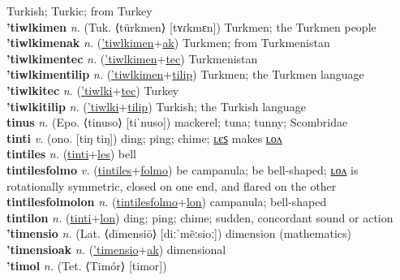 Turkish; Turkic; from Turkey \label{'tiwlkiak} \\
\textbf{'tiwlkimen} \textit{n.} (Tuk. ⟨türkmen⟩ [tʏɾkmɛn])
Turkmen; the Turkmen people \label{'tiwlkimen} \\
\textbf{'tiwlkimenak} \textit{n.} (\hyperref['tiwlkimen]{'tiwlkimen}+\hyperref[ak]{ak})
Turkmen; from Turkmenistan \label{'tiwlkimenak} \\
\textbf{'tiwlkimentec} \textit{n.} (\hyperref['tiwlkimen]{'tiwlkimen}+\hyperref[tec]{tec})
Turkmenistan \label{'tiwlkimentec} \\
\textbf{'tiwlkimentilip} \textit{n.} (\hyperref['tiwlkimen]{'tiwlkimen}+\hyperref[tilip]{tilip})
Turkmen; the Turkmen language \label{'tiwlkimentilip} \\
\textbf{'tiwlkitec} \textit{n.} (\hyperref['tiwlki]{'tiwlki}+\hyperref[tec]{tec})
Turkey \label{'tiwlkitec} \\
\textbf{'tiwlkitilip} \textit{n.} (\hyperref['tiwlki]{'tiwlki}+\hyperref[tilip]{tilip})
Turkish; the Turkish language \label{'tiwlkitilip} \\
\textbf{tinus} \textit{n.} (Epo. ⟨tinuso⟩ [tiˈnuso])
mackerel; tuna; tunny; Scombridae \label{tinus} \\
\textbf{tinti} \textit{v.} (ono. [tiŋ tiŋ])
ding; ping; chime; \hyperref[tintiles]{ʟєꜱ} makes \hyperref[tintilon]{ʟᴏᴧ} \label{tinti} \\
\textbf{tintiles} \textit{n.} (\hyperref[tinti]{tinti}+\hyperref[les]{les})
bell \label{tintiles} \\
\textbf{tintilesfolmo} \textit{v.} (\hyperref[tintiles]{tintiles}+\hyperref[folmo]{folmo})
be campanula; be bell-shaped; \hyperref[tintilesfolmolon]{ʟᴏᴧ} is rotationally symmetric, closed on one end, and flared on the other \label{tintilesfolmo} \\
\textbf{tintilesfolmolon} \textit{n.} (\hyperref[tintilesfolmo]{tintilesfolmo}+\hyperref[lon]{lon})
campanula; bell-shaped \label{tintilesfolmolon} \\
\textbf{tintilon} \textit{n.} (\hyperref[tinti]{tinti}+\hyperref[lon]{lon})
ding; ping; chime; sudden, concordant sound or action \label{tintilon} \\
\textbf{'timensio} \textit{n.} (Lat. ⟨dīmensiō⟩ [diːˈmẽːsioː])
dimension (mathematics) \label{'timensio} \\
\textbf{'timensioak} \textit{n.} (\hyperref['timensio]{'timensio}+\hyperref[ak]{ak})
dimensional \label{'timensioak} \\
\textbf{'timol} \textit{n.} (Tet. ⟨Timór⟩ [timor])
